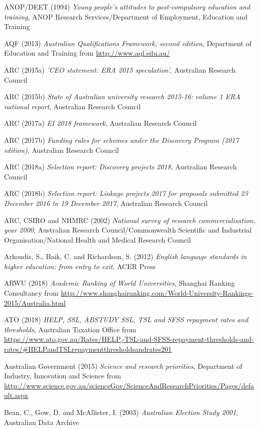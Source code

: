 \documentclass[]{book}
\begin{document}
ANOP/DEET (1994) \emph{Young people's attitudes to post-compulsory education and training}, ANOP Research Services/Department of Employment, Education and Training

\protect\hypertarget{_ENREF_20}{}{}AQF (2013) \emph{Australian Qualifications Framework, second edition}, Department of Education and Training from \url{http://www.aqf.edu.au/}

ARC (2015a) \emph{'CEO statement: ERA 2015 speculation'}, Australian Research Council

\protect\hypertarget{_ENREF_22}{}{}ARC (2015b) \emph{State of Australian university research 2015-16: volume 1 ERA national report}, Australian Research Council

ARC (2017a) \emph{EI 2018 framework}, Australian Research Council

ARC (2017b) \emph{Funding rules for schemes under the Discovery Program (2017 edition)}, Australian Research Council

ARC (2018a) \emph{Selection report: Discovery projects 2018}, Australian Research Council

ARC (2018b) \emph{Selection report: Linkage projects 2017 for proposals submitted 23 December 2016 to 19 December 2017}, Australian Research Council

ARC, CSIRO and NHMRC (2002) \emph{National survey of research commercialisation, year 2000}, Australian Research Council/Commonwealth Scientific and Industrial Organisation/National Health and Medical Research Council

Arkoudis, S., Baik, C. and Richardson, S. (2012) \emph{English language standards in higher education: from entry to exit}, ACER Press

\protect\hypertarget{_ENREF_29}{}{}ARWU (2018) \emph{Academic Ranking of World Universities}, Shanghai Ranking Consultancy from \url{http://www.shanghairanking.com/World-University-Rankings-2015/Australia.html}

ATO (2018) \emph{HELP, SSL, ABSTUDY SSL, TSL and SFSS repayment rates and thresholds}, Australian Taxation Office from \url{https://www.ato.gov.au/Rates/HELP,-TSL-and-SFSS-repayment-thresholds-and-rates/\#HELPandTSLrepaymentthresholdsandrates201}

Australian Government (2015) \emph{Science and research priorities}, Department of Industry, Innovation and Science from \url{http://www.science.gov.au/scienceGov/ScienceAndResearchPriorities/Pages/default.aspx}

\protect\hypertarget{_ENREF_32}{}{}Bean, C., Gow, D. and McAllister, I. (2003) \emph{Australian Election Study 2001}, Australian Data Archive
\end{document}
